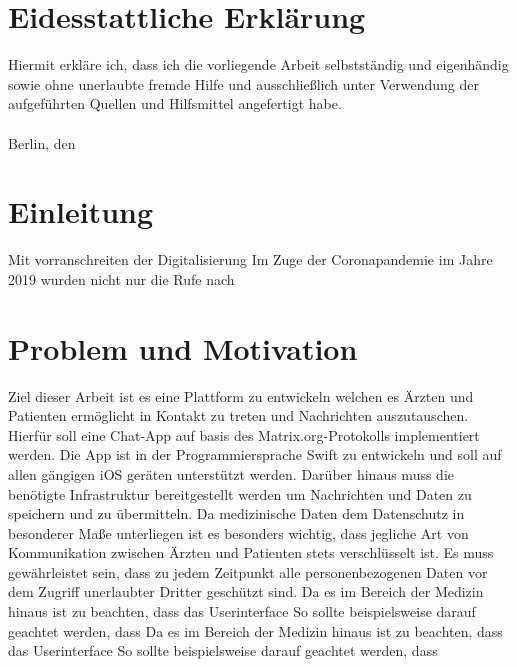     \chapter*{Eidesstattliche Erklärung}\label{ch:eidesstattliche-erklarung}
    Hiermit erkläre ich, dass ich die vorliegende Arbeit selbstständig und eigenhändig sowie ohne
    unerlaubte fremde Hilfe und ausschließlich unter Verwendung der aufgeführten Quellen und
    Hilfsmittel angefertigt habe.\\
    \vspace{1cm}\\
    Berlin, den \underline{\hspace{3cm}} \hfill \DeinName \underline{\hspace{4cm}}

    \newpage
    \tableofcontents

    \mainmatter

    \newpage
    \chapter{Einleitung}\label{ch:einleitung}
    Mit vorranschreiten der Digitalisierung
    Im Zuge der Coronapandemie im Jahre 2019 wurden nicht nur die Rufe nach

    \chapter{Problem und Motivation}\label{ch:problembeschreibung-und-motivation}
    Ziel dieser Arbeit ist es eine Plattform zu entwickeln welchen es Ärzten und Patienten ermöglicht in Kontakt zu treten und Nachrichten auszutauschen.
    Hierfür soll eine Chat-App auf basis des Matrix.org-Protokolls implementiert werden.
    Die App ist in der Programmiersprache Swift zu entwickeln und soll auf allen gängigen iOS geräten unterstützt werden.
    Darüber hinaus muss die benötigte Infrastruktur bereitgestellt werden um Nachrichten und Daten zu speichern und zu übermitteln.
    Da medizinische Daten dem Datenschutz in besonderer Maße unterliegen ist es besonders wichtig,
    dass jegliche Art von Kommunikation zwischen Ärzten und Patienten stets verschlüsselt ist.
    Es muss gewährleistet sein, dass zu jedem Zeitpunkt alle personenbezogenen Daten vor dem Zugriff unerlaubter Dritter geschützt sind.
    Da es im Bereich der Medizin  hinaus ist zu beachten, dass das Userinterface
    So sollte beispielsweise darauf geachtet werden, dass Da es im Bereich der Medizin hinaus ist zu beachten, dass das Userinterface
    So sollte beispielsweise darauf geachtet werden, dass

